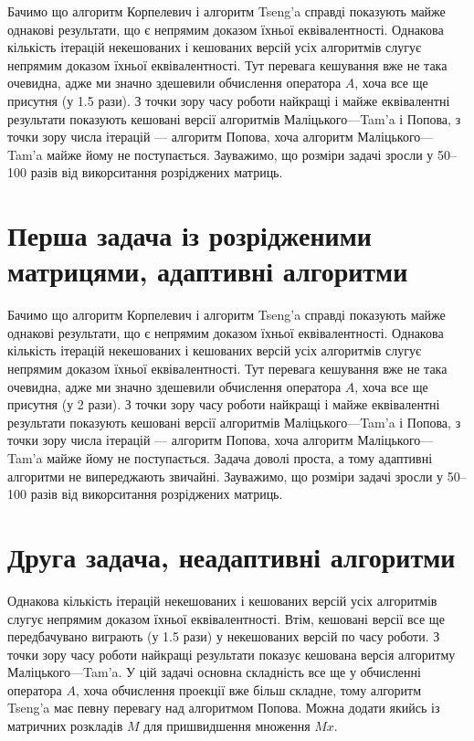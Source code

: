 

Бачимо що алгоритм Корпелевич і алгоритм Tseng'a справді показують майже однакові результати, що є непрямим доказом їхньої еквівалентності. Однакова кількість ітерацій некешованих і кешованих версій усіх алгоритмів слугує непрямим доказом їхньої еквівалентності. Тут перевага кешування вже не така очевидна, адже ми значно здешевили обчислення оператора $A$, хоча все ще присутня (у 1.5 рази). З точки зору часу роботи найкращі і майже еквівалентні результати показують кешовані версії алгоритмів Маліцького---Tam'a і Попова, з точки зору числа ітерацій --- алгоритм Попова, хоча алгоритм Маліцького---Tam'a майже йому не поступається. Зауважимо, що розміри задачі зросли у 50--100 разів від викорситання розріджених матриць.

\section{Перша задача із розрідженими матрицями, адаптивні алгоритми}



Бачимо що алгоритм Корпелевич і алгоритм Tseng'a справді показують майже однакові результати, що є непрямим доказом їхньої еквівалентності. Однакова кількість ітерацій некешованих і кешованих версій усіх алгоритмів слугує непрямим доказом їхньої еквівалентності. Тут перевага кешування вже не така очевидна, адже ми значно здешевили обчислення оператора $A$, хоча все ще присутня (у 2 рази). З точки зору часу роботи найкращі і майже еквівалентні результати показують кешовані версії алгоритмів Маліцького---Tam'a і Попова, з точки зору числа ітерацій --- алгоритм Попова, хоча алгоритм Маліцького---Tam'a майже йому не поступається. Задача доволі проста, а тому адаптивні алгоритми не випереджають звичайні. Зауважимо, що розміри задачі зросли у 50--100 разів від викорситання розріджених матриць.

\section{Друга задача, неадаптивні алгоритми}



Однакова кількість ітерацій некешованих і кешованих версій усіх алгоритмів слугує непрямим доказом їхньої еквівалентності. Втім, кешовані версії все ще передбачувано виграють (у 1.5 рази) у некешованих версій по часу роботи. З точки зору часу роботи найкращі результати показує кешована версія алгоритму Маліцького---Tam'a. У цій задачі основна складність все ще у обчисленні оператора $A$, %
хоча обчислення проекції вже більш складне, %
тому алгоритм Tseng'a має певну перевагу над алгоритмом Попова. Можна додати якийсь із матричних розкладів $M$ для пришвидшення множення $M x$.

